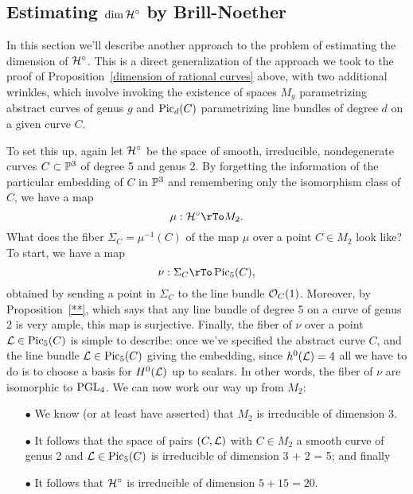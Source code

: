 \subsection{Estimating $\dim {\cal H}^\circ$ by Brill-Noether}

In this section we'll describe another approach to the problem of estimating the dimension of ${\cal H}^\circ$. This is a direct generalization of the approach we took to the proof of Proposition~\ref{dimension of rational curves} above, with two additional wrinkles, which involve invoking the existence of  spaces $M_g$ parametrizing abstract curves of genus $g$ and $\operatorname{Pic}_d(C)$ parametrizing line bundles of degree $d$ on a given curve $C$.

To set this up, again let ${\cal H}^\circ$ be the space of smooth, irreducible, nondegenerate curves $C \subset {\mathbb P}^3$ of degree 5 and genus 2. By forgetting the information of the particular embedding of $C$ in ${\mathbb P}^3$ and remembering only the isomorphism class of $C$, we have a map
$$
\mu : \cH^\circ \rTo M_2.
$$
What does the fiber $\Sigma_C =\mu^{-1}(C)$ of the map $\mu$ over a point $C \in M_2$ look like? To start, we have a map
$$
\nu : \Sigma_C \rTo \Pic_5(C),
$$
obtained by sending a point in $\Sigma_C$ to the line bundle ${\mathcal O}_C(1)$. Moreover, by Proposition~\ref{**}, which says that any line bundle of degree 5 on a curve of genus 2 is very ample, this map is surjective. Finally, the fiber of $\nu$ over a point ${\mathcal L} \in \operatorname{Pic}_5(C)$ is simple to describe: once we've specified the abstract curve $C$, and the line bundle ${\mathcal L} \in \operatorname{Pic}_5(C)$ giving the embedding, since $h^0({\mathcal L}) = 4$ all we have to do is to choose a basis for $H^0({\mathcal L})$ up to scalars. In other words, the fiber of $\nu$ are isomorphic to $\operatorname{PGL}_4$. We can now work our way up from $M_2$:

\begin{enumerate}

\item[$\bullet$] We know (or at least have asserted) that $M_2$ is irreducible of dimension 3.

\item[$\bullet$] It follows that the space of pairs $(C,{\mathcal L})$ with $C \in M_2$ a smooth curve of genus 2 and ${\mathcal L} \in \operatorname{Pic}_5(C)$ is irreducible of dimension 3 + 2 = 5; and finally

\item[$\bullet$] It follows that ${\cal H}^\circ$ is irreducible of dimension $5 + 15 = 20$.

\end{enumerate}

